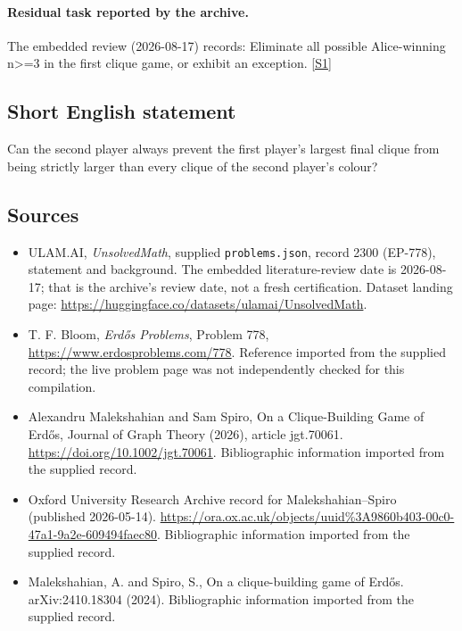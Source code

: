 \documentclass[11pt,a4paper]{article}
\newcommand{\sref}[2]{\hyperlink{source:#1:#2}{[S#2]}}
\begin{document}
\paragraph{Residual task reported by the archive.}

The embedded review (2026-08-17) records: Eliminate all possible Alice-winning n>=3 in the first clique game, or exhibit an exception. \sref{2300}{1}

\subsection{Short English statement}

Can the second player always prevent the first player's largest final clique from being strictly larger than every clique of the second player's colour?

\subsection{Sources}

{\small

\begin{itemize}

\item[\hypertarget{source:2300:1}{S1}] ULAM.AI, \emph{UnsolvedMath}, supplied \texttt{problems.json}, record 2300 (EP-778), statement and background. The embedded literature-review date is 2026-08-17; that is the archive’s review date, not a fresh certification. Dataset landing page: \url{https://huggingface.co/datasets/ulamai/UnsolvedMath}.

\item[\hypertarget{source:2300:2}{S2}] T. F. Bloom, \emph{Erdős Problems}, Problem 778, \url{https://www.erdosproblems.com/778}. Reference imported from the supplied record; the live problem page was not independently checked for this compilation.

\item[\hypertarget{source:2300:3}{S3}] Alexandru Malekshahian and Sam Spiro, On a Clique-Building Game of Erdős, Journal of Graph Theory (2026), article jgt.70061. \url{https://doi.org/10.1002/jgt.70061}. Bibliographic information imported from the supplied record.

\item[\hypertarget{source:2300:4}{S4}] Oxford University Research Archive record for Malekshahian--Spiro (published 2026-05-14). \url{https://ora.ox.ac.uk/objects/uuid%3A9860b403-00c0-47a1-9a2e-609494faec80}. Bibliographic information imported from the supplied record.

\item[\hypertarget{source:2300:5}{S5}] Malekshahian, A. and Spiro, S., On a clique-building game of Erd\H{o}s. arXiv:2410.18304 (2024). Bibliographic information imported from the supplied record.

\end{itemize}

}

\label{end:2300}
\end{document}
